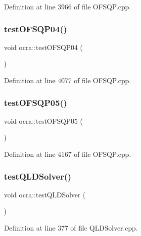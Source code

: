 Definition at line 3966 of file O\+F\+S\+Q\+P.\+cpp.

\hypertarget{namespaceocra_acf7cfddec1df04bdc3e79218c23aa76b}{}\label{namespaceocra_acf7cfddec1df04bdc3e79218c23aa76b} 
\subsubsection{\texorpdfstring{test\+O\+F\+S\+Q\+P04()}{testOFSQP04()}}
{\footnotesize\ttfamily void ocra\+::test\+O\+F\+S\+Q\+P04 (\begin{DoxyParamCaption}{ }\end{DoxyParamCaption})}



Definition at line 4077 of file O\+F\+S\+Q\+P.\+cpp.

\hypertarget{namespaceocra_a6f6693e777254b71f5a87a33173d7e90}{}\label{namespaceocra_a6f6693e777254b71f5a87a33173d7e90} 
\subsubsection{\texorpdfstring{test\+O\+F\+S\+Q\+P05()}{testOFSQP05()}}
{\footnotesize\ttfamily void ocra\+::test\+O\+F\+S\+Q\+P05 (\begin{DoxyParamCaption}{ }\end{DoxyParamCaption})}



Definition at line 4167 of file O\+F\+S\+Q\+P.\+cpp.

\hypertarget{namespaceocra_a2510cb421dc6b566033e810223abdf05}{}\label{namespaceocra_a2510cb421dc6b566033e810223abdf05} 
\subsubsection{\texorpdfstring{test\+Q\+L\+D\+Solver()}{testQLDSolver()}}
{\footnotesize\ttfamily void ocra\+::test\+Q\+L\+D\+Solver (\begin{DoxyParamCaption}{ }\end{DoxyParamCaption})}



Definition at line 377 of file Q\+L\+D\+Solver.\+cpp.

